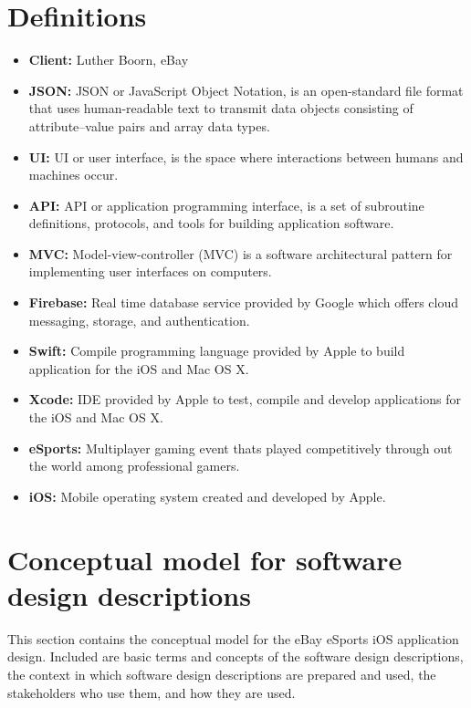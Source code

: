 \documentclass[onecolumn, draftclsnofoot,10pt, compsoc]{IEEEtran}
\begin{document}
\section{Definitions}

\begin{itemize}

\item \textbf{Client:} Luther Boorn, eBay
\item \textbf{JSON:} JSON or JavaScript Object Notation, is an open-standard file format that uses human-readable text to transmit data objects consisting of attribute–value pairs and array data types.
\item \textbf{UI:} UI or user interface, is the space where interactions between humans and machines occur.
\item \textbf{API:} API or application programming interface, is a set of subroutine definitions, protocols, and tools for building application software.
\item \textbf{MVC:} Model-view-controller (MVC) is a software architectural pattern for implementing user interfaces on computers.
\item \textbf{Firebase:} Real time database service provided by Google which offers cloud messaging, storage, and authentication.
\item \textbf{Swift:} Compile programming language provided by Apple to build application for the iOS and Mac OS X.
\item \textbf{Xcode:} IDE provided by Apple to test, compile and develop applications for the iOS and Mac OS X.
\item \textbf{eSports:} Multiplayer gaming event thats played competitively through out the world among professional gamers.
\item \textbf{iOS:} Mobile operating system created and developed by Apple. 

\end{itemize}

\section{Conceptual model for software design descriptions}
This section contains the conceptual model for the eBay eSports iOS application design. 
Included are basic terms and concepts of the software design descriptions, the context in which software design descriptions are prepared and used, the stakeholders who use them, and how they are used.
\end{document}
